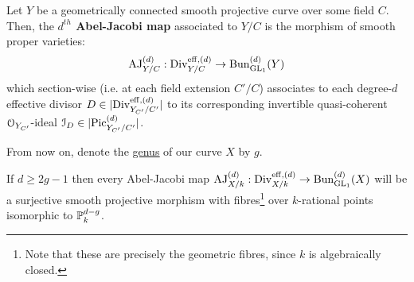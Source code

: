         \begin{definition} \label{def: the_abel_jacobi_map}
            Let $Y$ be a geometrically connected smooth projective curve over some field $C$. Then, the \textbf{$d^{th}$ Abel-Jacobi map} associated to $Y/C$ is the morphism of smooth proper varieties:
                $$\AJ_{Y/C}^{(d)}: \Div_{Y/C}^{\eff, (d)} \to \Bun_{\GL_1}^{(d)}(Y)$$
            which section-wise (i.e. at each field extension $C'/C$) associates to each degree-$d$ effective divisor $D \in |\Div_{Y_{C'}/C'}^{\eff, (d)}|$ to its corresponding invertible quasi-coherent $\calO_{Y_{C'}}$-ideal $\calI_D \in |\Pic_{Y_{C'}/C'}^{(d)}|$.
        \end{definition}
        \begin{convention} \label{conv: genus_of_the_curve}
            From now on, denote the \href{https://stacks.math.columbia.edu/tag/0BY6}{\underline{genus}} of our curve $X$ by $g$.
        \end{convention}
        \begin{proposition} \label{prop: the_abel_jacobi_map_is_a_smooth_projective_fibration}
            If $d \geq 2g - 1$ then every Abel-Jacobi map $\AJ_{X/k}^{(d)}: \Div_{X/k}^{\eff, (d)} \to \Bun_{\GL_1}^{(d)}(X)$ will be a surjective smooth projective morphism with fibres\footnote{Note that these are precisely the geometric fibres, since $k$ is algebraically closed.} over $k$-rational points isomorphic to $\P^{d - g}_k$.
        \end{proposition}
